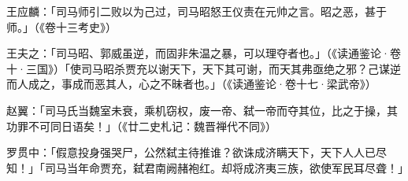 王应麟：「司马师引二败以为己过，司马昭怒王仪责在元帅之言。昭之恶，甚于师。」（《卷十三考史》）

王夫之：「司马昭、郭威虽逆，而固非朱温之暴，可以理夺者也。」（《读通鉴论·卷十·三国》）「使司马昭杀贾充以谢天下，天下其可谢，而天其弗亟绝之邪？己谋逆而人成之，事成而恶其人，心之不昧者也。」（《读通鉴论·卷十七·梁武帝》）

赵翼：「司马氏当魏室未衰，乘机窃权，废一帝、弑一帝而夺其位，比之于操，其功罪不可同日语矣！」（《廿二史札记：魏晋禅代不同》）

罗贯中：「假意投身强哭尸，公然弑主待推谁？欲诛成济瞒天下，天下人人已尽知！」「司马当年命贾充，弑君南阙赭袍红。却将成济夷三族，欲使军民耳尽聋！」






